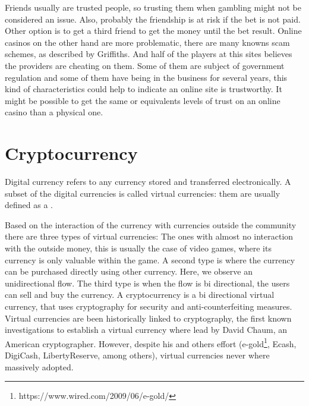 \begin{intro}
Friends usually are trusted people, so trusting them when gambling might not
  be considered an issue. Also, probably the friendship is at risk if the bet
  is not paid. Other option is to get a third friend to get the money until the
  bet result.
Online casinos on the other hand are more problematic, there are many knowns
  scam schemes, as described by Griffiths\cite{griffiths2010crime}. And
  half of the players at this sites believes the providers are cheating on
  them\cite{mcmullan2010online}. Some of them are subject of government
  regulation and some of them have being in the business for several years,
  this kind of characteristics could help to indicate an online site is
  trustworthy. It might be possible to get the same or equivalents levels of
  trust on an online casino than a physical one.

  
\section{Cryptocurrency}
Digital currency refers to any currency stored and transferred
  electronically.
  A subset of the digital currencies is called virtual currencies: them are
  usually defined\cite{bcentraleuro} as a .
  
Based on the interaction of the currency with currencies outside the
  community there are three types of virtual currencies: The ones with almost
  no interaction with the outside money, this is usually the case of video
  games, where its currency is only valuable within the game. A second
  type is where the currency can be purchased directly using other currency.
  Here, we observe an unidirectional flow. The third type is when the flow is
  bi directional, the users can sell and buy the currency. 
A cryptocurrency is a bi directional virtual currency, that uses cryptography
  for security and anti-counterfeiting measures. Virtual currencies are been
  historically linked to cryptography, the first known investigations
  \cite{chaum1983blind} to establish a virtual currency where lead by David
  Chaum, an American cryptographer. However, despite his and others effort
  (e-gold\footnote{https://www.wired.com/2009/06/e-gold/},
   Ecash\cite{chaum1990untraceable},
   DigiCash, LibertyReserve, among others), virtual currencies never where
   massively adopted.
   

\end{intro}
